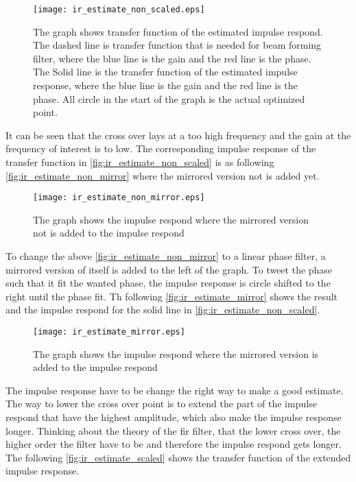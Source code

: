 \begin{figure}[H]
	\centering
	\texttt{[image: ir\_estimate\_non\_scaled.eps]}
	\caption{The graph shows transfer function of the estimated impulse respond. The dashed line is transfer function that is needed for beam forming filter, where the blue line is the gain and the red line is the phase. The Solid line is the transfer function of the estimated impulse response, where the blue line is the gain and the red line is the phase. All circle in the start of the graph is the actual optimized point.}
		\label{fig:ir_estimate_non_scaled}
\end{figure}


It can be seen that the cross over lays at a too high frequency and the gain at the frequency of interest is to low. The corresponding impulse response of the transfer function in \autoref{fig:ir_estimate_non_scaled} is as following \autoref{fig:ir_estimate_non_mirror} where the mirrored version not is added yet. 

\begin{figure}[H]
	\centering
	\texttt{[image: ir\_estimate\_non\_mirror.eps]}
	\caption{The graph shows the impulse respond where the mirrored version not is added to the impulse respond}
		\label{fig:ir_estimate_non_mirror}
\end{figure}

To change the above \autoref{fig:ir_estimate_non_mirror} to a linear phase filter, a mirrored version of itself is added to the left of the graph. To tweet the phase such that it fit the wanted phase, the impulse response is circle shifted to the right until the phase fit. Th following \autoref{fig:ir_estimate_mirror} shows the result and the impulse respond for the solid line in \autoref{fig:ir_estimate_non_scaled}.

\begin{figure}[H]
	\centering
	\texttt{[image: ir\_estimate\_mirror.eps]}
	\caption{The graph shows the impulse respond where the mirrored version is added to the impulse respond}
		\label{fig:ir_estimate_mirror}
\end{figure}


The impulse response have to be change the right way to make a good estimate. The way to lower the cross over point is to extend the part of the impulse respond that have the highest amplitude, which also make the impulse response longer. Thinking about the theory of the \gls{fir} filter, that the lower cross over, the higher order the filter have to be and therefore the impulse respond gets longer.  The following  \autoref{fig:ir_estimate_scaled} shows the transfer function of the extended impulse response.


